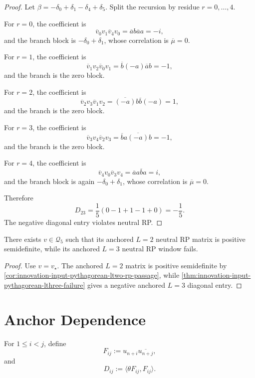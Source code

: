 \begin{proof}
Let $\beta=-\delta_0+\delta_1-\delta_4+\delta_5$. Split the recursion by
residue $r=0,\ldots,4$.

For $r=0$, the coefficient is
$$
\overline v_0v_1\overline v_4v_0=\overline a b\overline a a=-i,
$$
and the branch block is $-\delta_0+\delta_1$, whose correlation is
$\overline\mu=0$.

For $r=1$, the coefficient is
$$
\overline v_1v_2\overline v_0v_1=\overline b(-a)\overline a b=-1,
$$
and the branch is the zero block.

For $r=2$, the coefficient is
$$
\overline v_2v_3\overline v_1v_2=\overline{(-a)}b\overline b(-a)=1,
$$
and the branch is the zero block.

For $r=3$, the coefficient is
$$
\overline v_3v_4\overline v_2v_3=\overline b a\overline{(-a)}b=-1,
$$
and the branch is the zero block.

For $r=4$, the coefficient is
$$
\overline v_4v_0\overline v_3v_4=\overline a a\overline b a=i,
$$
and the branch block is again $-\delta_0+\delta_1$, whose correlation is
$\overline\mu=0$.

Therefore
$$
D_{23}
=
\frac15(0-1+1-1+0)
=
-\frac15.
$$
The negative diagonal entry violates neutral RP.
\end{proof}

\begin{corollary}[Anchored $L=2$ does not imply anchored $L=3$]
\label{cor:innovation-input-ltwo-not-lthree}
There exists $v\in\mathcal Q_5$ such that its anchored $L=2$ neutral RP
matrix is positive semidefinite, while its anchored $L=3$ neutral RP
window fails.
\end{corollary}

\begin{proof}
Use $v=v_\star$. The anchored $L=2$ matrix is positive semidefinite by
\autoref{cor:innovation-input-pythagorean-ltwo-rp-passage}, while
\autoref{thm:innovation-input-pythagorean-lthree-failure} gives a negative
anchored $L=3$ diagonal entry.
\end{proof}

\section{Anchor Dependence}
\label{sec:innovation-input-anchor-dependence}

\begin{definition}
\label{def:innovation-input-anchored-link-diagonal}
For $1\le i<j$, define
$$
F_{ij}:=u_{n+i}\overline{u_{n+j}},
$$
and
$$
D_{ij}:=\langle\theta F_{ij},F_{ij}\rangle.
$$
\end{definition}

